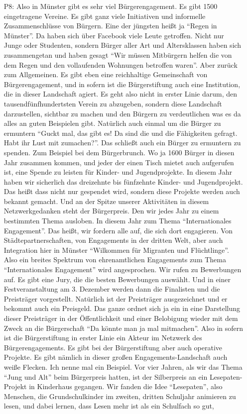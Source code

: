\begin{itemize}
    \item[P8:] Also in M{\"u}nster gibt es sehr viel B{\"u}rgerengagement. Es gibt 1500 eingetragene Vereine. Es gibt ganz viele Initiativen und informelle Zusammenschl{\"u}sse von B{\"u}rgern. Eine der j{\"u}ngsten hei{\ss}t ja "`Regen in M{\"u}nster"'. Da haben sich {\"u}ber Facebook viele Leute getroffen. Nicht nur Junge oder Studenten, sondern B{\"u}rger aller Art und Altersklassen haben sich zusammengetan und haben gesagt "`Wir m{\"u}ssen Mitb{\"u}rgern helfen die von dem Regen und den vollaufenden Wohnungen betroffen waren"'. Aber zur{\"u}ck zum Allgemeinen. Es gibt eben eine reichhaltige Gemeinschaft von B{\"u}rgerengagement, und in sofern ist die B{\"u}rgerstiftung auch eine Institution, die in dieser Landschaft agiert. Es geht also nicht in erster Linie darum, den tausendf{\"u}nfhundertsten Verein zu abzugeben, sondern diese Landschaft darzustellen, sichtbar zu machen und den B{\"u}rgern zu verdeutlichen was es da alles an guten Beispielen gibt. Nat{\"u}rlich auch einmal um die B{\"u}rger zu ermuntern "`Guckt mal, das gibt es! Da sind die und die F{\"a}higkeiten gefragt. Habt ihr Lust mit zumachen?"'. Das schlie{\ss}t auch ein B{\"u}rger zu ermuntern zu spenden. Zum Beispiel bei dem B{\"u}rgerbrunch. Wo ja 1600 B{\"u}rger in diesen Jahr zusammen kommen, und jeder der einen Tisch mietet auch aufgerufen ist, eine Spende zu leisten f{\"u}r Kinder- und Jugendprojekte. In diesem Jahr haben wir sicherlich das dreizehnte bis f{\"u}nfzehnte Kinder- und Jugendprojekt. Das hei{\ss}t dass nicht nur gespendet wird, sondern diese Projekte werden auch bekannt gemacht. Und an der Spitze unserer Aktivit{\"a}ten in diesem Netzwerkgedanken steht der B{\"u}rgerpreis. Den wir jedes Jahr zu einem bestimmten Thema ausloben. In diesem Jahr zum Thema "`Internationales Engagement"'. Das hei{\ss}t, wir fordern alle auf, die sich dort engagieren. Von St{\"a}dtepartnerschaften, von Engagements in der dritten Welt, aber auch Integration hier in M{\"u}nster "`Wilkommen f{\"u}r Migranten und Fl{\"u}chtlinge"'. Also ein breites Spektrum von ehrenamtlichen Engagements zum Thema "`Internationales Engagement"' wird angesprochen. Wir rufen zu Bewerbungen auf. Es gibt eine Jury, die die besten Bewerbungen ausw{\"a}hlt. Und in einer Festveranstaltung am 3. Dezember werden dann die Finalisten und die Preistr{\"a}ger vorgestellt. Nat{\"u}rlich ist der Preistr{\"a}ger ausgezeichnet und er bekommt auch ein Preisgeld. Das ganze ordnet sich ja ein in eine Darstellung dieser Preistr{\"a}ger in der {\"O}ffentlichkeit und einer Belobigung wieder mit dem Zweck an die B{\"u}rgerschaft "`Da k{\"o}nnte man ja mal mitmachen"'. Also in sofern ist die B{\"u}rgerstiftung in erster Linie ein Akteur im Netzwerk des B{\"u}rgerengagements. Es gibt bei der B{\"u}rgerstiftung aber auch operative Projekte. Es gibt n{\"a}mlich in dieser gro{\ss}en Engagements-Landschaft auch wei{\ss}e Flecken. Ich nenne mal ein Beispiel. Vor vier Jahren, als wir das Thema "`Jung und Alt"' beim B{\"u}rgerpreis hatten, ist der Silberpreis an ein Lesepaten-Projekt in Kinderhaus gegangen. Wir fanden die Idee "`Lesepaten"', also Menschen, die Grundschulkinder im zweiten, dritten Schuljahr animieren zu lesen, und dabei lernen, dass Lesen mehr ist als ein Schulfach so gut, 
\end{itemize}
